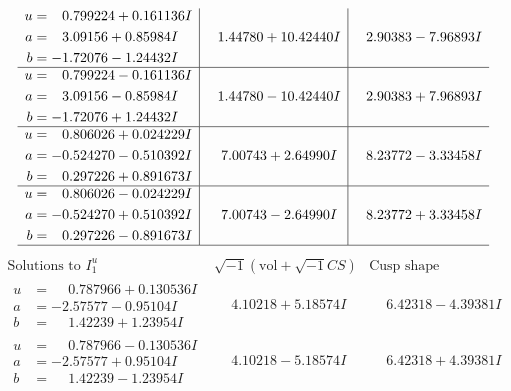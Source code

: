 \documentclass[1p]{elsarticle_modified}
\theoremstyle{definition}
\newcommand{\I}{\sqrt{-1}}
\begin{document}
$$\begin{array}{c|c|c}
\begin{aligned}
u &= \phantom{-}0.799224 + 0.161136 I \\
a &= \phantom{-}3.09156 + 0.85984 I \\
b &= -1.72076 - 1.24432 I\end{aligned}
 & \phantom{-}1.44780 + 10.42440 I & \phantom{-}2.90383 - 7.96893 I \\ \hline\begin{aligned}
u &= \phantom{-}0.799224 - 0.161136 I \\
a &= \phantom{-}3.09156 - 0.85984 I \\
b &= -1.72076 + 1.24432 I\end{aligned}
 & \phantom{-}1.44780 - 10.42440 I & \phantom{-}2.90383 + 7.96893 I \\ \hline\begin{aligned}
u &= \phantom{-}0.806026 + 0.024229 I \\
a &= -0.524270 - 0.510392 I \\
b &= \phantom{-}0.297226 + 0.891673 I\end{aligned}
 & \phantom{-}7.00743 + 2.64990 I & \phantom{-}8.23772 - 3.33458 I \\ \hline\begin{aligned}
u &= \phantom{-}0.806026 - 0.024229 I \\
a &= -0.524270 + 0.510392 I \\
b &= \phantom{-}0.297226 - 0.891673 I\end{aligned}
 & \phantom{-}7.00743 - 2.64990 I & \phantom{-}8.23772 + 3.33458 I\\
 \hline 
 \end{array}$$\newpage$$\begin{array}{c|c|c}  
\text{Solutions to }I^u_{1}& \I (\text{vol} + \sqrt{-1}CS) & \text{Cusp shape}\\
 \hline 
\begin{aligned}
u &= \phantom{-}0.787966 + 0.130536 I \\
a &= -2.57577 - 0.95104 I \\
b &= \phantom{-}1.42239 + 1.23954 I\end{aligned}
 & \phantom{-}4.10218 + 5.18574 I & \phantom{-}6.42318 - 4.39381 I \\ \hline\begin{aligned}
u &= \phantom{-}0.787966 - 0.130536 I \\
a &= -2.57577 + 0.95104 I \\
b &= \phantom{-}1.42239 - 1.23954 I\end{aligned}
 & \phantom{-}4.10218 - 5.18574 I & \phantom{-}6.42318 + 4.39381 I \\ \hline\begin{aligned}

\end{aligned}
\end{array}$$
\end{document}
